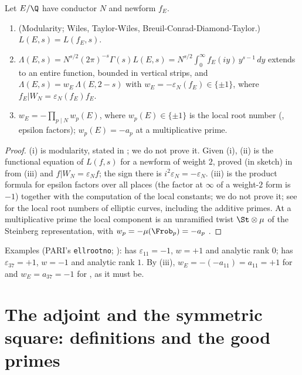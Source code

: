 \begin{theorem}\label{thm:lfunctions:LE-feq}
Let $E/\Q$ have conductor $N$ and newform $f_E$.
\begin{enumerate}[label=(\roman*)]
\item (Modularity; Wiles, Taylor-Wiles, Breuil-Conrad-Diamond-Taylor.) $L(E,s)=L(f_E,s)$.
\item $\Lambda(E,s)=N^{s/2}(2\pi)^{-s}\Gamma(s)L(E,s)=N^{s/2}\int_0^\infty f_E(iy)\,y^{s-1}\,dy$ extends to an entire function, bounded in vertical strips, and
$\Lambda(E,s)=w_E\,\Lambda(E,2-s)$ with $w_E=-\varepsilon_N(f_E)\in\{\pm1\}$, where $f_E|W_N=\varepsilon_N(f_E)f_E$.
\item $w_E=-\prod_{p\mid N}w_p(E)$, where $w_p(E)\in\{\pm1\}$ is the local root number (, epsilon factors); $w_p(E)=-a_p$ at a multiplicative prime.
\end{enumerate}
\end{theorem}

\begin{proof}
(i) is modularity, stated in  \cite{Wiles95,TaylorWiles,BCDT}; we do not prove it. Given (i), (ii) is the functional equation of $L(f,s)$ for a newform
of weight $2$, proved (in sketch) in  from (iii) and $f|W_N=\varepsilon_Nf$; the sign there is $i^2\varepsilon_N=-\varepsilon_N$. (iii) is the
product formula for epsilon factors over all places (the factor at $\infty$ of a weight-$2$ form is $-1$) together with the computation of the local constants;
we do not prove it; see \cite{Rohrlich94} for the local root numbers of elliptic curves, including the additive primes. At a multiplicative prime the local
component is an unramified twist $\St\otimes\mu$ of the Steinberg representation, with $w_p=-\mu(\Frob_p)=-a_p$ \cite{Rohrlich94}.
\end{proof}

Examples (PARI's \texttt{ellrootno}; ):  has $\varepsilon_{11}=-1$, $w=+1$ and analytic rank $0$;  has $\varepsilon_{37}=+1$, $w=-1$ and analytic
rank $1$. By (iii), $w_E=-(-a_{11})=a_{11}=+1$ for  and $w_E=a_{37}=-1$ for , as it must be.

\section[The adjoint and the symmetric square]{The adjoint and the symmetric square: definitions and the good primes}\label{sec:lfunctions:adjoint}

